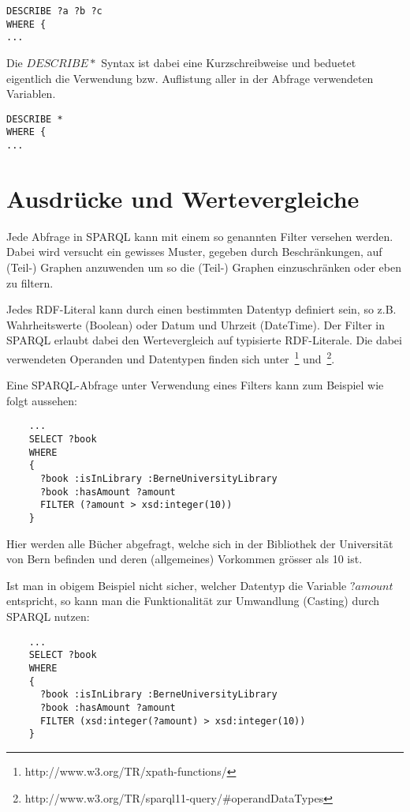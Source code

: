 \begin{lstlisting}
DESCRIBE ?a ?b ?c
WHERE {
...
\end{lstlisting}

Die $ DESCRIBE * $ Syntax ist dabei eine Kurzschreibweise und beduetet eigentlich die Verwendung bzw. Auflistung aller in der Abfrage verwendeten Variablen. 
\begin{lstlisting}
DESCRIBE *
WHERE {
...
\end{lstlisting}

\section{Ausdrücke und Wertevergleiche}
\label{sec:sparql_ausdruecke}

Jede Abfrage in SPARQL kann mit einem so genannten Filter versehen werden. Dabei wird versucht ein gewisses Muster, gegeben durch Beschränkungen, auf (Teil-) Graphen anzuwenden um so die (Teil-) Graphen einzuschränken oder eben zu filtern.

Jedes RDF-Literal kann durch einen bestimmten Datentyp definiert sein, so z.B. Wahrheitswerte (Boolean) oder Datum und Uhrzeit (DateTime). Der Filter in SPARQL erlaubt dabei den Wertevergleich auf typisierte RDF-Literale. Die dabei verwendeten Operanden und Datentypen finden sich unter~\footnote{http://www.w3.org/TR/xpath-functions/} und~\footnote{http://www.w3.org/TR/sparql11-query/\#operandDataTypes}.

Eine SPARQL-Abfrage unter Verwendung eines Filters kann zum Beispiel wie folgt aussehen:
\begin{lstlisting}
    ...
    SELECT ?book
    WHERE
    {
      ?book :isInLibrary :BerneUniversityLibrary
      ?book :hasAmount ?amount
      FILTER (?amount > xsd:integer(10))
    }
\end{lstlisting}
Hier werden alle Bücher abgefragt, welche sich in der Bibliothek der Universität von Bern befinden und deren (allgemeines) Vorkommen grösser als 10 ist.

Ist man in obigem Beispiel nicht sicher, welcher Datentyp die Variable $?amount$ entspricht, so kann man die Funktionalität zur Umwandlung (Casting) durch SPARQL nutzen:
\begin{lstlisting}
    ...
    SELECT ?book
    WHERE
    {
      ?book :isInLibrary :BerneUniversityLibrary
      ?book :hasAmount ?amount
      FILTER (xsd:integer(?amount) > xsd:integer(10))
    }
\end{lstlisting}

